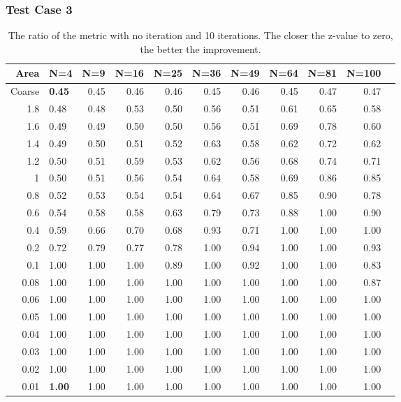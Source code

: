 \documentclass[compress]{beamer}
\begin{document}
\begin{frame}[t]\frametitle{Test Case 3}
\begin{table}[H]
\centering
\tiny
\caption{The ratio  of the metric with no iteration and 10 iterations. The closer the z-value to zero, the better the improvement.} 
\begin{tabular}{rlrrrrrrrrr}
  \hline
  Area & N=4 & N=9 & N=16 & N=25 & N=36 & N=49 & N=64 & N=81 & N=100 \\ 
  \hline
Coarse & \textbf{\cellcolor{blue!25}0.45} & 0.45 & 0.46 & 0.46 & 0.45 & 0.46 & 0.45 & 0.47 & 0.47 \\ 
  1.8 & 0.48 & 0.48 & 0.53 & 0.50 & 0.56 & 0.51 & 0.61 & 0.65 & 0.58 \\ 
 1.6 & 0.49 & 0.49 & 0.50 & 0.50 & 0.56 & 0.51 & 0.69 & 0.78 & 0.60 \\ 
 1.4 & 0.49 & 0.50 & 0.51 & 0.52 & 0.63 & 0.58 & 0.62 & 0.72 & 0.62 \\ 
 1.2 & 0.50 & 0.51 & 0.59 & 0.53 & 0.62 & 0.56 & 0.68 & 0.74 & 0.71 \\ 
1 & 0.50 & 0.51 & 0.56 & 0.54 & 0.64 & 0.58 & 0.69 & 0.86 & 0.85 \\ 
 0.8 & 0.52 & 0.53 & 0.54 & 0.54 & 0.64 & 0.67 & 0.85 & 0.90 & 0.78 \\ 
 0.6 & 0.54 & 0.58 & 0.58 & 0.63 & 0.79 & 0.73 & 0.88 & 1.00 & 0.90 \\ 
 0.4 & 0.59 & 0.66 & 0.70 & 0.68 & 0.93 & 0.71 & 1.00 & 1.00 & 1.00 \\ 
   0.2 & 0.72 & 0.79 & 0.77 & 0.78 & 1.00 & 0.94 & 1.00 & 1.00 & 0.93 \\ 
 0.1 & 1.00 & 1.00 & 1.00 & 0.89 & 1.00 & 0.92 & 1.00 & 1.00 & 0.83 \\ 
 0.08 & 1.00 & 1.00 & 1.00 & 1.00 & 1.00 & 1.00 & 1.00 & 1.00 & 0.87 \\ 
 0.06 & 1.00 & 1.00 & 1.00 & 1.00 & 1.00 & 1.00 & 1.00 & 1.00 & 1.00 \\ 
 0.05 & 1.00 & 1.00 & 1.00 & 1.00 & 1.00 & 1.00 & 1.00 & 1.00 & 1.00 \\ 
0.04 & 1.00 & 1.00 & 1.00 & 1.00 & 1.00 & 1.00 & 1.00 & 1.00 & 1.00 \\ 
  0.03 & 1.00 & 1.00 & 1.00 & 1.00 & 1.00 & 1.00 & 1.00 & 1.00 & 1.00 \\ 
  0.02 & 1.00 & 1.00 & 1.00 & 1.00 & 1.00 & 1.00 & 1.00 & 1.00 & 1.00 \\ 
  0.01 & \textbf{\cellcolor{blue!25}1.00} & 1.00 & 1.00 & 1.00 & 1.00 & 1.00 & 1.00 & 1.00 & 1.00 \\ 
   \hline
\end{tabular}
\end{table}
\end{frame}
\end{document}
